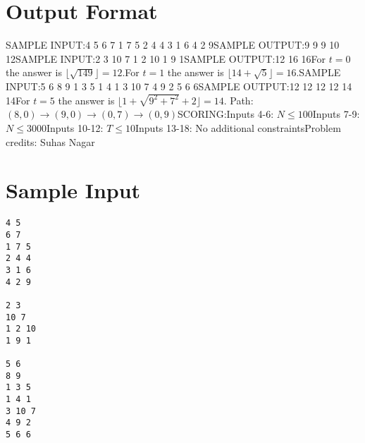 \documentclass[12pt]{article}
\begin{document}
\section*{Output Format}
SAMPLE INPUT:4 5
6 7
1 7 5
2 4 4
3 1 6
4 2 9SAMPLE OUTPUT:9
9
9
10
12SAMPLE INPUT:2 3
10 7
1 2 10
1 9 1SAMPLE OUTPUT:12
16
16For $t=0$ the answer is $\lfloor \sqrt{149} \rfloor=12$.For $t=1$ the answer is $\lfloor 14+\sqrt 5\rfloor=16$.SAMPLE INPUT:5 6
8 9
1 3 5
1 4 1
3 10 7
4 9 2
5 6 6SAMPLE OUTPUT:12
12
12
12
14
14For $t=5$ the answer is $\lfloor 1+\sqrt{9^2+7^2}+2\rfloor=14$. Path:
$(8,0)\to (9,0)\to (0,7)\to (0,9)$SCORING:Inputs 4-6: $N\le 100$Inputs 7-9: $N\le 3000$Inputs 10-12: $T\le 10$Inputs 13-18: No additional constraintsProblem credits: Suhas Nagar

\section*{Sample Input}
\begin{verbatim}
4 5
6 7
1 7 5
2 4 4
3 1 6
4 2 9

2 3
10 7
1 2 10
1 9 1

5 6
8 9
1 3 5
1 4 1
3 10 7
4 9 2
5 6 6
\end{verbatim}
\end{document}
